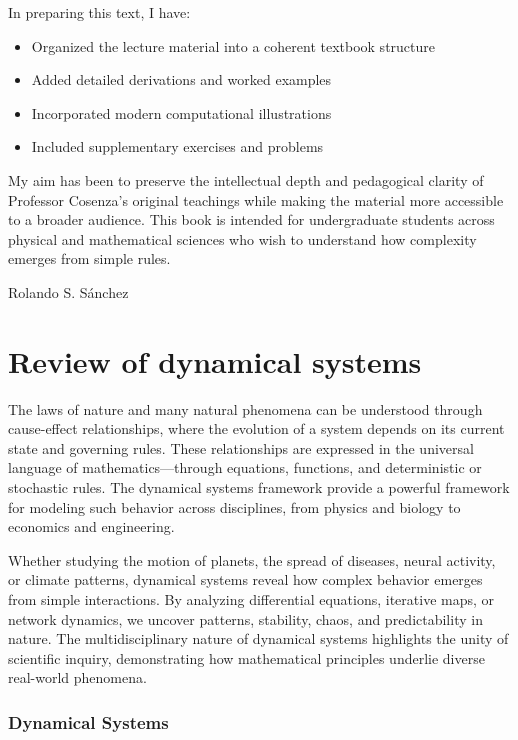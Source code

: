 \documentclass[10pt]{article}
\begin{document}
  In preparing this text, I have:
  \begin{itemize}
      \item Organized the lecture material into a coherent textbook structure
      \item Added detailed derivations and worked examples
      \item Incorporated modern computational illustrations
      \item Included supplementary exercises and problems
  \end{itemize}

  My aim has been to preserve the intellectual depth and pedagogical clarity of Professor Cosenza's original teachings while making the 
  material more accessible to a broader audience. This book is intended for undergraduate students across physical and mathematical sciences 
  who wish to understand how complexity emerges from simple rules.

  \begin{flushright}
    Rolando S. Sánchez
    \end{flushright}

  \flushbottom
  \newpage
  \pagestyle{fancynotes}
  
  \part{Review of dynamical systems}
  The laws of nature and many natural phenomena can be understood through cause-effect relationships, where the evolution of a 
  system depends on its current state and governing rules. These relationships are expressed in the universal language of 
  mathematics—through equations, functions, and deterministic or stochastic rules. The dynamical systems framework provide a powerful
  framework for modeling such behavior across disciplines, from physics and biology to economics and engineering.  

  Whether studying the motion of planets, the spread of diseases, neural activity, or climate patterns, dynamical systems reveal how 
  complex behavior emerges from simple interactions. By analyzing differential equations, iterative maps, or network dynamics, 
  we uncover patterns, stability, chaos, and predictability in nature. The multidisciplinary nature of dynamical systems highlights 
  the unity of scientific inquiry, demonstrating how mathematical principles underlie diverse real-world phenomena.
  \section{Dynamical Systems}
\end{document}
